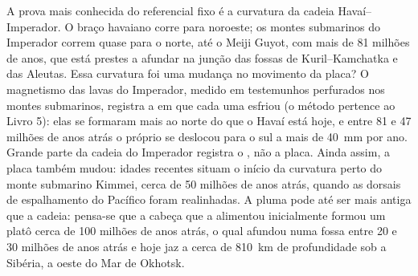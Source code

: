 A prova mais conhecida do referencial fixo é a curvatura da cadeia Havaí--Imperador. O braço havaiano corre para noroeste; os montes submarinos do Imperador correm quase para o norte, até o Meiji Guyot, com mais de 81 milhões de anos, que está prestes a afundar na junção das fossas de Kuril--Kamchatka e das Aleutas. Essa curvatura foi uma mudança no movimento da placa? O magnetismo das lavas do Imperador, medido em testemunhos perfurados nos montes submarinos, registra a  em que cada uma esfriou (o método pertence ao Livro 5): elas se formaram mais ao norte do que o Havaí está hoje, e entre 81 e 47 milhões de anos atrás o próprio  se deslocou para o sul a mais de \qty{40}{mm} por ano. Grande parte da cadeia do Imperador registra o , não a placa. Ainda assim, a placa também mudou: idades recentes situam o início da curvatura perto do monte submarino Kimmei, cerca de 50 milhões de anos atrás, quando as dorsais de espalhamento do Pacífico foram realinhadas. A pluma pode até ser mais antiga que a cadeia: pensa-se que a cabeça que a alimentou inicialmente formou um platô cerca de 100 milhões de anos atrás, o qual afundou numa fossa entre 20 e 30 milhões de anos atrás e hoje jaz a cerca de \qty{810}{km} de profundidade sob a Sibéria, a oeste do Mar de Okhotsk.

